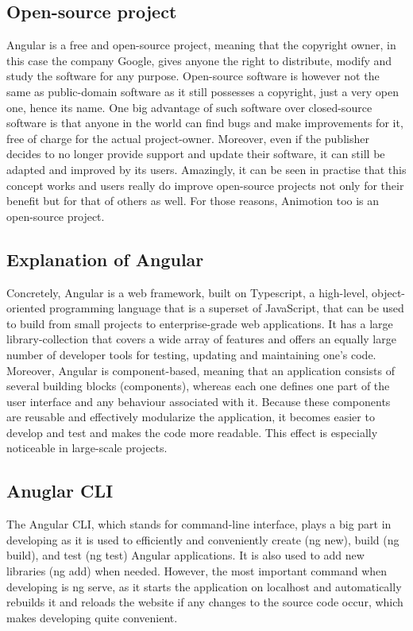 \subsection{Open-source project}
Angular is a free and open-source project, meaning that the copyright owner, in this case the company Google,
gives anyone the right to distribute, modify and study the software for any purpose. Open-source software is 
however not the same as public-domain software as it still possesses a copyright, just a very open one, hence its name. 
One big advantage of such software over closed-source software is that anyone in the world can find bugs and make 
improvements for it, free of charge for the actual project-owner. Moreover, even if the publisher decides to no longer 
provide support and update their software, it can still be adapted and improved by its users. Amazingly, it can be seen 
in practise that this concept works and users really do improve open-source projects not only for their benefit but for 
that of others as well. For those reasons, Animotion too is an open-source project.\cite{Opensource}

\subsection{Explanation of Angular}
Concretely, Angular is a web framework, built on Typescript, a high-level, object-oriented programming language that is 
a superset of JavaScript, that can be used to build from small projects to enterprise-grade web applications. It has a 
large library-collection that covers a wide array of features and offers an equally large number of developer tools for 
testing, updating and maintaining one's code. Moreover, Angular is component-based, meaning that an application consists 
of several building blocks (components), whereas each one defines one part of the user interface and any behaviour associated 
with it. Because these components are reusable and effectively modularize the application, it becomes easier to develop and 
test and makes the code more readable. This effect is especially noticeable in large-scale projects. \cite{AngularDescription}

\subsection{Anuglar CLI}
The Angular CLI, which stands for command-line interface, plays a big part in developing as it is used to efficiently and 
conveniently create (ng new), build (ng build), and test (ng test) Angular applications. It is also used to add new libraries 
(ng add) when needed. However, the most important command when developing is ng serve, as it starts the application on 
localhost and automatically rebuilds it and reloads the website if any changes to the source code occur, which makes 
developing quite convenient. \cite{AngularCLI}

